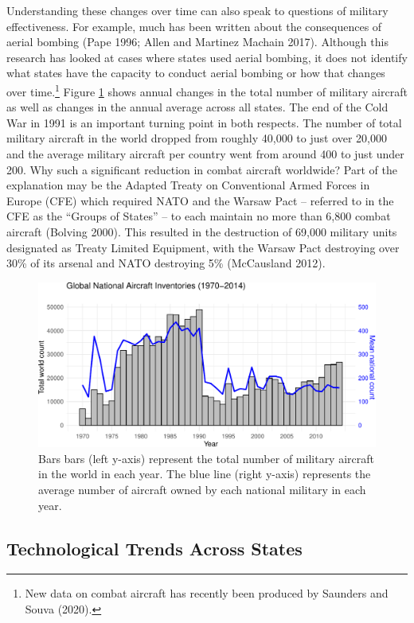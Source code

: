 \documentclass[
]{article}
\begin{document}
Understanding these changes over time can also speak to questions of military effectiveness. For example, much has been written about the consequences of aerial bombing (Pape 1996; Allen and Martinez Machain 2017). Although this research has looked at cases where states used aerial bombing, it does not identify what states have the capacity to conduct aerial bombing or how that changes over time.\footnote{New data on combat aircraft has recently been produced by Saunders and Souva (2020).} Figure \ref{fig:aircraft} shows annual changes in the total number of military aircraft as well as changes in the annual average across all states. The end of the Cold War in 1991 is an important turning point in both respects. The number of total military aircraft in the world dropped from roughly 40,000 to just over 20,000 and the average military aircraft per country went from around 400 to just under 200. Why such a significant reduction in combat aircraft worldwide? Part of the explanation may be the Adapted Treaty on Conventional Armed Forces in Europe (CFE) which required NATO and the Warsaw Pact -- referred to in the CFE as the ``Groups of States'' -- to each maintain no more than 6,800 combat aircraft (Bolving 2000). This resulted in the destruction of 69,000 military units designated as Treaty Limited Equipment, with the Warsaw Pact destroying over 30\% of its arsenal and NATO destroying 5\% (McCausland 2012).

\begin{figure}
\centering
\includegraphics{figures/aircraft-1.pdf}
\caption{\label{fig:aircraft}Bars bars (left y-axis) represent the total number of military aircraft in the world in each year. The blue line (right y-axis) represents the average number of aircraft owned by each national military in each year.}
\end{figure}

\hypertarget{technological-trends-across-states}{%
\subsection{Technological Trends Across States}\label{technological-trends-across-states}}
\end{document}
